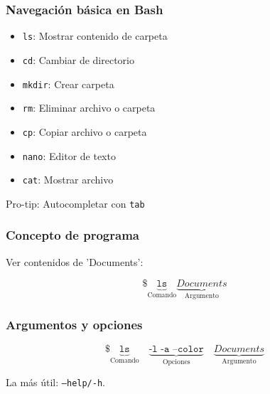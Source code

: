 \documentclass[14pt,aspectratio=169,xcolor=dvipsnames]{beamer}
\begin{document}
\begin{frame}\frametitle{Navegación básica en Bash}
    \begin{itemize}
        \item \texttt{ls}: Mostrar contenido de carpeta
        \item \texttt{cd}: Cambiar de directorio
        \item \texttt{mkdir}: Crear carpeta
        \item \texttt{rm}: Eliminar archivo o carpeta
        \item \texttt{cp}: Copiar archivo o carpeta
        \item \texttt{nano}: Editor de texto
        \item \texttt{cat}: Mostrar archivo
    \end{itemize}

\vspace{1cm} 
Pro-tip: Autocompletar con \texttt{tab}
\end{frame}
\begin{frame}[fragile]\frametitle{Concepto de programa}
Ver contenidos de 'Documents':

    $$ \texttt{\$ }\underbrace{\texttt{ls}}_\text{Comando}  \underbrace{Documents}_\text{Argumento} $$
\end{frame}
\begin{frame}\frametitle{Argumentos y opciones}
    
    $$ \texttt{\$ }\underbrace{\texttt{ls}}_\text{Comando} \quad \underbrace{\texttt{-l -a --color}}_\text{Opciones} \quad \underbrace{Documents}_\text{Argumento} $$

La más útil: \texttt{--help/-h}. 

\vspace{1cm}
\end{frame}
\end{document}
